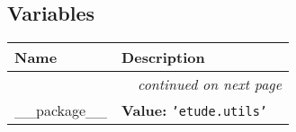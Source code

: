   \subsection{Variables}

    \vspace{-1cm}
\hspace{\varindent}\begin{longtable}{|p{\varnamewidth}|p{\vardescrwidth}|l}
\cline{1-2}
\cline{1-2} \centering \textbf{Name} & \centering \textbf{Description}& \\
\cline{1-2}
\endhead\cline{1-2}\multicolumn{3}{r}{\small\textit{continued on next page}}\\\endfoot\cline{1-2}
\endlastfoot\raggedright \_\-\_\-p\-a\-c\-k\-a\-g\-e\-\_\-\_\- & \raggedright \textbf{Value:} 
{\tt \texttt{'}\texttt{etude.utils}\texttt{'}}&\\
\cline{1-2}
\end{longtable}

